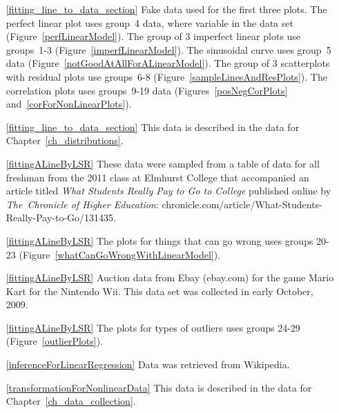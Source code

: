 






\begin{itemize}
\item[\ref{fitting_line_to_data_section}]
    Fake data used for the first three plots.
    The perfect linear plot uses group~4 data,
    where  variable in the data set
    (Figure~\ref{perfLinearModel}).
    The group of 3 imperfect linear plots use groups~1-3
    (Figure~\ref{imperfLinearModel}).
    The sinusoidal curve uses group~5 data
    (Figure~\ref{notGoodAtAllForALinearModel}).
        The group of 3 scatterplots with residual plots use groups~6-8
    (Figure~\ref{sampleLinesAndResPlots}).
    The correlation plots uses groups~9-19 data
    (Figures~\ref{posNegCorPlots} and~\ref{corForNonLinearPlots}).
\item[\ref{fitting_line_to_data_section}]
    This data is described in
    the data for Chapter~\ref{ch_distributions}.

\item[\ref{fittingALineByLSR}]
    These data were sampled from a table of data for all
    freshman from the 2011 class at Elmhurst College that
    accompanied an article titled
    \emph{What Students Really Pay to Go to College}
    published online by \emph{The~Chronicle of Higher Education}:
        {chronicle.com/article/What-Students-Really-Pay-to-Go/131435}.
\item[\ref{fittingALineByLSR}]
    The plots for things that can go wrong uses groups 20-23
    (Figure~\ref{whatCanGoWrongWithLinearModel}).
\item[\ref{fittingALineByLSR}]
    Auction data from Ebay (ebay.com) for the game Mario Kart
    for the Nintendo Wii.
    This data set was collected in early October, 2009.

\item[\ref{fittingALineByLSR}]
    The plots for types of outliers uses groups 24-29
    (Figure~\ref{outlierPlots}).

\item[\ref{inferenceForLinearRegression}]
    Data was retrieved from Wikipedia.

\item[\ref{transformationForNonlinearData}]
    This data is described in
    the data for Chapter~\ref{ch_data_collection}.

\end{itemize}





